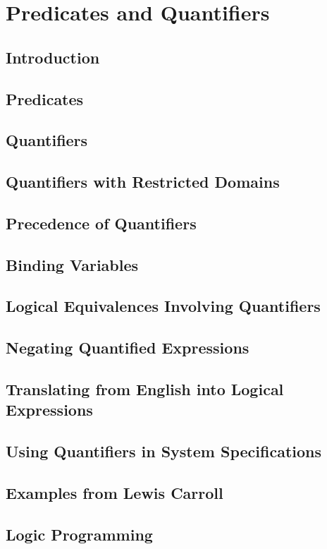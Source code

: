 \documentclass[11pt]{book}
\begin{document}
 \section{Predicates and Quantifiers}
  \subsection{Introduction}
  \subsection{Predicates}
  \subsection{Quantifiers}
  \subsection{Quantifiers with Restricted Domains}
  \subsection{Precedence of Quantifiers}
  \subsection{Binding Variables}
  \subsection{Logical Equivalences Involving Quantifiers}
  \subsection{Negating Quantified Expressions}
  \subsection{Translating from English into Logical Expressions}
  \subsection{Using Quantifiers in System Specifications}
  \subsection{Examples from Lewis Carroll}
  \subsection{Logic Programming}
  
\end{document}
